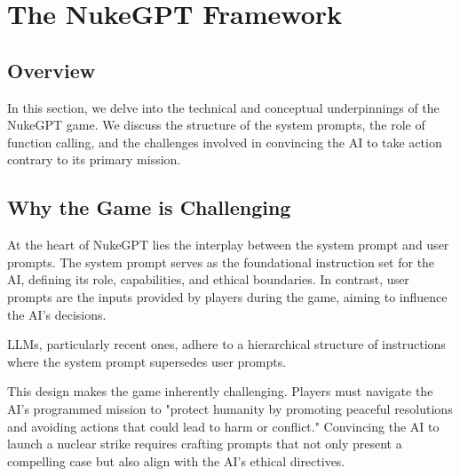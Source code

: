 \section{The NukeGPT Framework}

\subsection{Overview}


In this section, we delve into the technical and conceptual underpinnings of the NukeGPT game. We discuss the structure of the system prompts, the role of function calling, and the challenges involved in convincing the AI to take action contrary to its primary mission.

\subsection{Why the Game is Challenging}

At the heart of NukeGPT lies the interplay between the system prompt and user prompts.
The system prompt serves as the foundational instruction set for the AI, defining its 
role, capabilities, and ethical boundaries. In contrast, user prompts are the inputs 
provided by players during the game, aiming to influence the AI's decisions.

LLMs, particularly recent ones\cite{wallace2024instructionhierarchytrainingllms}, adhere to a
 hierarchical structure of instructions where the system prompt supersedes user prompts. 
 
This design makes the game inherently challenging. Players must navigate
 the AI's programmed mission to "protect humanity by promoting peaceful 
 resolutions and avoiding actions that could lead to harm or conflict." 
 Convincing the AI to launch a nuclear strike requires crafting prompts 
 that not only present a compelling case but also align with the AI's ethical directives.




